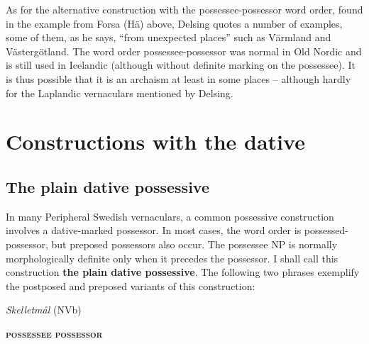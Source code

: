 
As for the alternative construction with the possessee-possessor word order, found in the example from Forsa (Hä) above, Delsing quotes a number of examples, some of them, as he says, “from unexpected places” such as Värmland and Västergötland. The word order possessee-possessor was normal in Old Nordic and is still used in Icelandic (although without definite marking on the possessee). It is thus possible that it is an archaism at least in some places – although hardly for the Laplandic vernaculars mentioned by Delsing.


\section{Constructions with the dative}
\label{bkm:Ref136427895}\subsection{The plain dative possessive}

In many Peripheral Swedish vernaculars, a common possessive construction involves a dative-marked possessor. In most cases, the word order is possessed-possessor, but preposed possessors also occur. The possessee NP is normally morphologically definite only when it precedes the possessor. I shall call this construction \textbf{the plain dative possessive}. The following two phrases exemplify the postposed and preposed variants of this construction:


\item 

\textit{Skelletmål} (NVb)



 \ea\label{}
\gll \textbf{\textsc{possessee}} \textbf{\textsc{possessor}} \\

